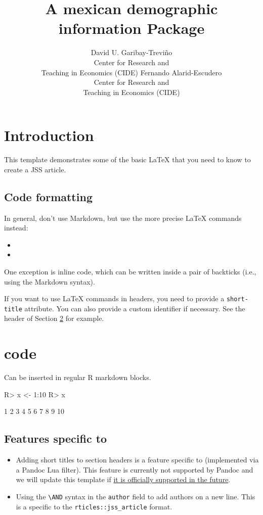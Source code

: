 \documentclass[
]{jss}
\author{
David U. Garibay-Treviño\\Center for Research and\\
Teaching in Economics (CIDE) \And Fernando Alarid-Escudero\\Center for
Research and\\
Teaching in Economics (CIDE)
}
\title{A mexican demographic information Package \pkg{demogmx}}
\providecommand{\tightlist}{%
  \setlength{\itemsep}{0pt}\setlength{\parskip}{0pt}}
\begin{document}
\hypertarget{introduction}{%
\section{Introduction}\label{introduction}}

This template demonstrates some of the basic LaTeX that you need to know
to create a JSS article.

\hypertarget{code-formatting}{%
\subsection{Code formatting}\label{code-formatting}}

In general, don't use Markdown, but use the more precise LaTeX commands
instead:

\begin{itemize}
\item
\item
\end{itemize}

One exception is inline code, which can be written inside a pair of
backticks (i.e., using the Markdown syntax).

If you want to use LaTeX commands in headers, you need to provide a
\texttt{short-title} attribute. You can also provide a custom identifier
if necessary. See the header of Section \ref{r-code} for example.

\section[R code]{ code}\label{r-code}

Can be inserted in regular R markdown blocks.

\begin{CodeChunk}
\begin{CodeInput}
R> x <- 1:10
R> x
\end{CodeInput}
\begin{CodeOutput}
 [1]  1  2  3  4  5  6  7  8  9 10
\end{CodeOutput}
\end{CodeChunk}

\subsection[Features specific to rticles]{Features specific to
}\label{features-specific-to}

\begin{itemize}
\tightlist
\item
  Adding short titles to section headers is a feature specific to
   (implemented via a Pandoc Lua filter). This feature is
  currently not supported by Pandoc and we will update this template if
  \href{https://github.com/jgm/pandoc/issues/4409}{it is officially
  supported in the future}.
\item
  Using the \texttt{\textbackslash{}AND} syntax in the \texttt{author}
  field to add authors on a new line. This is a specific to the
  \texttt{rticles::jss\_article} format.
\end{itemize}
\end{document}
